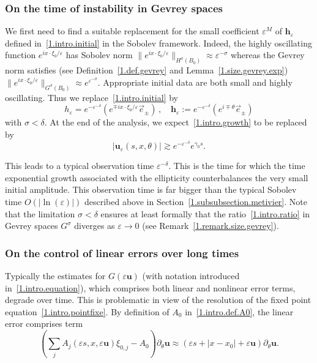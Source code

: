 \documentclass[AHL,Unicode,longabstracts,published]{cedram}
\theoremstyle{plain}
\newcommand*\e{\varepsilon}
\newcommand{\dptl}{\partial}%
\newcommand*\g{\gamma}
\newcommand{\ubf}{{\mathbf u}}
\newcommand*\h{{\mathbf h}}
\begin{document}
\subsubsection{On the time of instability in Gevrey spaces}\label{1.subsubsection.time}

We first need to find a suitable replacement for the small coefficient $\e^{M}$ of $\h_{\e}$ defined in~\eqref{1.intro.initial} in the Sobolev framework. Indeed, the highly oscillating function $e^{ix\cdot\xi_0/\e}$ has Sobolev norm $ \|e^{ix\cdot\xi_0/\e}\|_{H^{\sigma}(B_0)} \approx \e^{-\sigma} $ whereas the Gevrey norm satisfies (see Definition~\ref{1.def.gevrey} and Lemma~\ref{1.size.gevrey.exp}) $ \|e^{ix\cdot\xi_0/\e}\|_{G^{\sigma}(B_0)} \approx e^{\e^{-\sigma}}$. Appropriate initial data are both small and highly oscillating. Thus we replace~\eqref{1.intro.initial} by
\begin{equation}\label{1.intro.initial.gevrey}
h_{\e} = e^{-\e^{-\delta}} \left(e^{\mp i x\cdot\xi_0/\e} \vec{e}_{\pm} \right)\,, \quad \h_{\e} := e^{-\e^{-\delta}}\left(e^{i\mp \theta}\vec{e}_{\pm}\right)
\end{equation}
with $\sigma < \delta$. At the end of the analysis, we expect~\eqref{1.intro.growth} to be replaced by
\begin{equation}\label{1.intro.growth.gevrey}
|\ubf_{\e}(s,x,\theta)| \gtrsim e^{-\e^{-\delta}} e^{\g_0 s}.
\end{equation}

This leads to a typical observation time $ \e^{-\delta} $. This is the time for which the time exponential growth associated with the ellipticity counterbalances the very small initial amplitude. This observation time is far bigger than the typical Sobolev time $O(|\ln(\e)|)$ described above in Section~\ref{1.subsubsection.metivier}. Note that the limitation $\sigma < \delta$ ensures at least formally that the ratio~\eqref{1.intro.ratio} in Gevrey spaces $G^{\sigma}$ diverges as $\e\to0$ (see Remark~\ref{1.remark.size.gevrey}).


\subsubsection{On the control of linear errors over long times}\label{1.subsubsection.control}

Typically the estimates for $G(\e \ubf)$ (with notation introduced in~\eqref{1.intro.equation}), which comprises both linear and nonlinear error terms, degrade over time. This is problematic in view of the resolution of the fixed point equation~\eqref{1.intro.pointfixe}. By definition of $A_0$ in~\eqref{1.intro.def.A0}, the linear error comprises term
\[
\left(\sum_j A_j(\e s,x,\e\ubf) \xi_{0,j} - A_0\right)\dptl_{\theta} \ubf \approx \left(\e s + |x-x_0| + \e \ubf\right)\dptl_{\theta}\ubf.
\]
\end{document}
